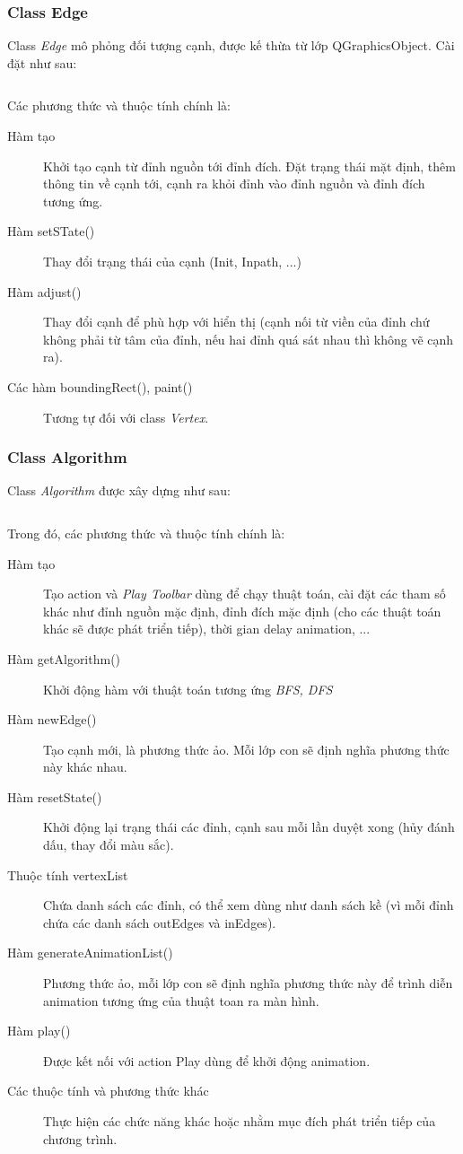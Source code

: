 \documentclass[a4paper,10pt]{article}
\newcommand{\mnt}[1]{\inputminted[frame=single, linenos=true, tabsize=4]{c++}{#1}}
\begin{document}
\subsubsection{Class Edge}
Class \emph{Edge} mô phỏng đối tượng cạnh, được kế thừa từ lớp QGraphicsObject. Cài đặt như sau:
\mnt{images/edge.h} 
Các phương thức và thuộc tính chính là:
\begin{description}
\item[Hàm tạo] Khởi tạo cạnh từ đỉnh nguồn tới đỉnh đích. Đặt trạng thái mặt định, thêm thông tin về cạnh tới, cạnh ra khỏi đỉnh vào đỉnh nguồn và đỉnh đích tương ứng.
\item[Hàm setSTate()] Thay đổi trạng thái của cạnh (Init, Inpath, ...)
\item[Hàm adjust()] Thay đổi cạnh để phù hợp với hiển thị (cạnh nối từ viền của đỉnh chứ không phải từ tâm của đỉnh, nếu hai đỉnh quá sát nhau thì không vẽ cạnh ra).
\item[Các hàm boundingRect(), paint()] Tương tự đối với class \emph{Vertex}.
\end{description}

\subsubsection{Class Algorithm}
Class \emph{Algorithm} được xây dựng như sau:
\mnt{images/algorithm.h}

Trong đó, các phương thức và thuộc tính chính là:
\begin{description}
\item[Hàm tạo ] Tạo action và \emph{Play Toolbar} dùng để chạy thuật toán, cài đặt các tham số khác như đỉnh nguồn mặc định, đỉnh đích mặc định (cho các thuật toán khác sẽ được phát triển tiếp), thời gian delay animation, ...
\item[Hàm getAlgorithm()] Khởi động hàm với thuật toán tương ứng \emph{BFS, DFS}
\item[Hàm newEdge()] Tạo cạnh mới, là phương thức ảo. Mỗi lớp con sẽ định nghĩa phương thức này khác nhau.
\item[Hàm resetState()] Khởi động lại trạng thái các đỉnh, cạnh sau mỗi lần duyệt xong (hủy đánh dấu, thay đổi màu sắc).
\item[Thuộc tính vertexList] Chứa danh sách các đỉnh, có thể xem dùng như danh sách kề (vì mỗi đỉnh chứa các danh sách outEdges và inEdges).
\item[Hàm generateAnimationList()] Phương thức ảo, mỗi lớp con sẽ định nghĩa phương thức này để trình diễn animation tương ứng của thuật toan ra màn hình.
\item[Hàm play()]  Được kết nối với action Play dùng để khởi động animation.
\item[Các thuộc tính và phương thức khác] Thực hiện các chức năng khác hoặc nhằm mục đích phát triển tiếp của chương trình.
\end{description}
\end{document}

